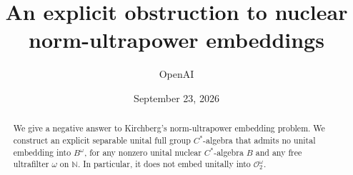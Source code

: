 \documentclass[11pt]{article}
\title{An explicit obstruction to nuclear norm-ultrapower embeddings}
\author{OpenAI}
\date{September 23, 2026}
\theoremstyle{definition}
\begin{document}
\maketitle
\begin{abstract}
We give a negative answer to Kirchberg's norm-ultrapower embedding problem.
We construct an explicit separable unital full group $C^*$-algebra that
admits no unital embedding into $B^\omega$, for any nonzero unital nuclear
$C^*$-algebra $B$ and any free ultrafilter $\omega$ on $\mathbb N$.
In particular, it does not embed unitally into $\mathcal O_2^\omega$.
\end{abstract}
\tableofcontents








\end{document}

